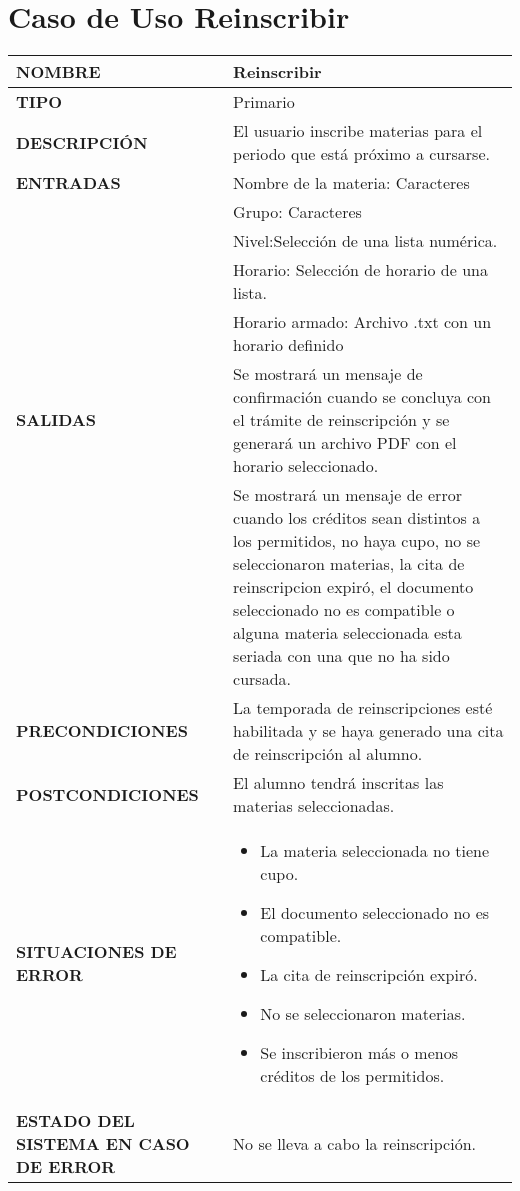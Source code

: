\newpage
\section{Caso de Uso Reinscribir}
\begin{longtable}{ | p{6cm} | p{10cm} |}
\hline
\textbf{NOMBRE} & Reinscribir\\
\hline
\textbf{TIPO} & Primario\\
\hline
\textbf{DESCRIPCIÓN} & El usuario inscribe materias para el periodo que está próximo a cursarse.\\
\hline
\textbf{ENTRADAS} & Nombre de la materia: Caracteres\\ & Grupo: Caracteres \\ & Nivel:Selección de una lista numérica.\\ & Horario: Selección de horario de una lista.\\ & Horario armado: Archivo .txt con un horario definido\\
\hline
\textbf{SALIDAS} & Se mostrará un mensaje de confirmación cuando se concluya con el trámite de reinscripción y se generará un archivo PDF con el horario seleccionado.\\ & Se mostrará un mensaje de error cuando los créditos sean distintos a los permitidos, no haya cupo, no se seleccionaron materias, la cita de reinscripcion expiró, el documento seleccionado no es compatible o alguna materia seleccionada esta seriada con una que no ha sido cursada.\\
\hline
\textbf{PRECONDICIONES} & La temporada de reinscripciones esté habilitada y se haya generado una cita de reinscripción al alumno.\\
\hline
\textbf{POSTCONDICIONES} & El alumno tendrá inscritas las materias seleccionadas.\\
\hline
\textbf{SITUACIONES DE ERROR} & \begin{itemize}
    \item La materia seleccionada no tiene cupo.
    \item El documento seleccionado no es compatible.
    \item La cita de reinscripción expiró.
    \item No se seleccionaron materias.
    \item Se inscribieron más o menos créditos de los permitidos.
\end{itemize}\\
\hline
\textbf{ESTADO DEL SISTEMA EN CASO DE ERROR} & No se lleva a cabo la reinscripción.\\

\end{longtable}
